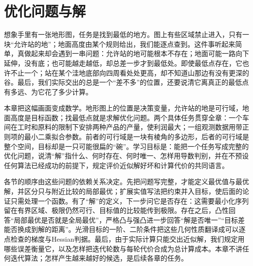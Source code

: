 \chapter{优化问题与解}
\label{chap:optimization}

想象手里有一张地形图，任务是找到最低的地方。图上有些区域禁止进入，只有一块“允许站的地”；地面高度由某个规则给出，我们能逐点查到。这件事听起来简单，真做起来却会遇到一串问题：允许站的地可能根本不存在；地面可能一路向下延伸，没有底；也可能越走越低，却总差一步才到最低处。即使最低点存在，它也许不止一个；站在某个洼地底部向四周看处处更高，却不知道山那边有没有更深的谷。最后，我们实际交出的总是一个“差不多”的位置，还要说清它离真正的最低点有多远、为它花了多少计算。

本章把这幅画面变成数学。地形图上的位置是决策变量，允许站的地是可行域，地面高度是目标函数；找最低点就是求解优化问题。两个具体任务贯穿全章：一个车间在工时和原料的限制下安排两种产品的产量，使利润最大；一组观测数据用带正则项的最小二乘拟合参数。前者的可行域是一块有棱角的多边形，后者的可行域是整个空间，目标却是一只可能很扁的“碗”。学习目标是：能把一个任务写成完整的优化问题，说清“解”指什么、何时存在、何时唯一、怎样用导数判别，并在不预设任何算法已经成功的前提下，规定评价近似解好坏和计算代价的共同语言。

各节的顺序由这些问题的依赖关系决定。先把问题写完整，才能定义最优值与最优解，并区分只与附近比较的局部最优；扩展实值写法把约束并入目标，使后面的论证只需处理一个函数。有了“解”的定义，下一步问它是否存在：这需要最小化序列留在有界区域、极限仍然可行、目标值的比较能传到极限。存在之后，凸性回答“局部最优是否就是全局最优”，严格凸与强凸进一步回答“解是否唯一”“目标差能否换成到解的距离”。光滑目标的一阶、二阶条件把这些几何性质翻译成可以逐点检查的梯度与Hessian判据。最后，由于实际计算只能交出近似解，我们规定用哪些误差衡量它，以及怎样把迭代轮数与每轮代价合成为总计算成本。本章不讲任何迭代算法；怎样产生越来越好的候选，是后续各章的任务。







